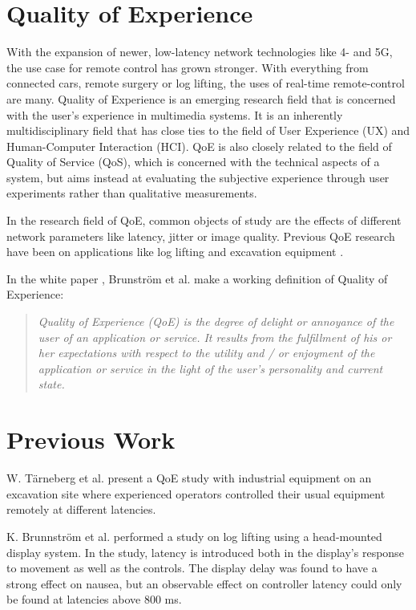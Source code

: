 \documentclass[nofilelist]{cslthse-msc}
\begin{document}
\section{Quality of Experience}
With the expansion of newer, low-latency network technologies like 4- and 5G, the use case for remote control has grown stronger. With everything from connected cars, remote surgery or log lifting, the uses of real-time remote-control are many. Quality of Experience is an emerging research field that is concerned with the user's experience in multimedia systems. It is an inherently multidisciplinary field that has close ties to the field of User Experience (UX) and Human-Computer Interaction (HCI). QoE is also closely related to the field of Quality of Service (QoS), which is concerned with the technical aspects of a system, but aims instead at evaluating the subjective experience through user experiments rather than qualitative measurements.

In the research field of QoE, common objects of study are the effects of different network parameters like latency, jitter or image quality. Previous QoE research have been on applications like log lifting \cite{industry4.0} and excavation equipment \cite{latency-impact}.

In the white paper \cite{qoe-definition}, Brunström et al. make a working definition of Quality of Experience: 

\begin{quote}
   \textit{Quality of Experience (QoE) is the degree of delight or annoyance of the user of an application or service. It results from the fulfillment of his or her expectations with respect to the utility and / or enjoyment of the application or service in the light of the user’s personality and current state.} 
\end{quote}


\section{Previous Work}

W. Tärneberg et al. \cite{industry4.0} present a QoE study with industrial equipment on an excavation site where experienced operators controlled their usual equipment remotely at different latencies. 

K. Brunnström et al. \cite{latency-impact} performed a study on log lifting using a head-mounted display system. In the study, latency is introduced both in the display's response to movement as well as the controls. The display delay was found to have a strong effect on nausea, but an observable effect on controller latency could only be found at latencies above 800 ms. 
\end{document}
